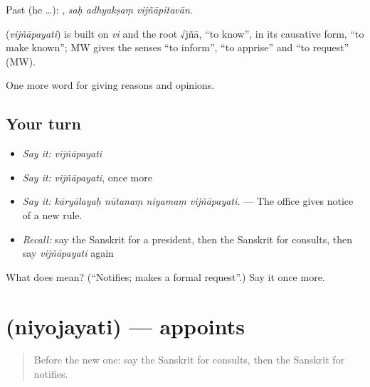 Past (he …):   , \emph{saḥ adhyakṣaṃ vijñāpitavān}.

\begin{cousinweb}
\textbf{} (\emph{vijñāpayati}) is built on \emph{vi} and the root √jñā, \textquotedblleft{}to know\textquotedblright{}, in its causative form, \textquotedblleft{}to make known\textquotedblright{}; MW gives the senses \textquotedblleft{}to inform\textquotedblright{}, \textquotedblleft{}to apprise\textquotedblright{} and \textquotedblleft{}to request\textquotedblright{} (MW).
\end{cousinweb}

\begin{grammarlens}[title={What you've built}]
One more word for giving reasons and opinions.
\end{grammarlens}

\subsection*{Your turn}
\begin{itemize}
\raggedright
  \item \emph{Say it:} \emph{vijñāpayati}
  \item \emph{Say it:} \emph{vijñāpayati}, once more
  \item \emph{Say it:} \emph{kāryālayaḥ nūtanaṃ niyamaṃ vijñāpayati.} — The office gives notice of a new rule.
  \item \emph{Recall:} say the Sanskrit for a president, then the Sanskrit for consults, then say \emph{vijñāpayati} again
\end{itemize}

\begin{tcolorbox}[breakable,colback=teal!4,colframe=teal!35!black,title={Before you move on}]
What does  mean? (\textquotedblleft{}Notifies; makes a formal request\textquotedblright{}.) Say it once more.
\end{tcolorbox}
\section[\texorpdfstring{\sk{नियोजयति} (niyojayati)}{नियोजयति (niyojayati)}]{ (niyojayati) — appoints}

\label{lesson:SA-C356-niyojayati}



\begin{quote}
Before the new one: say the Sanskrit for consults, then the Sanskrit for notifies.
\end{quote}

